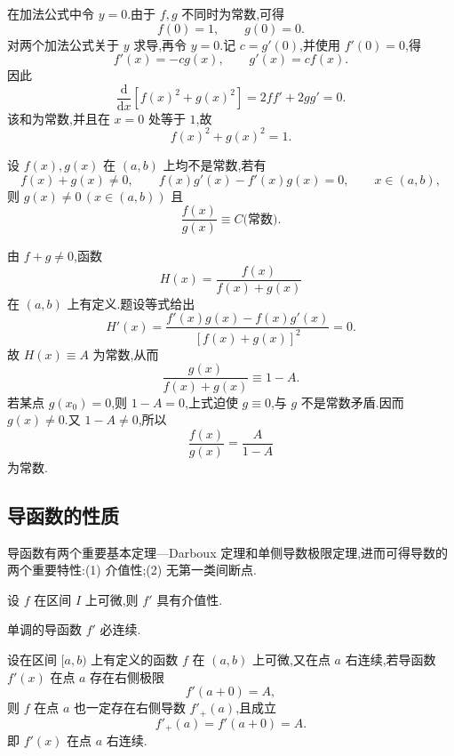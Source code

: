 \begin{solution}
    在加法公式中令 $y=0$.由于 $f,g$ 不同时为常数,可得
    \[
        f(0)=1,
        \qquad
        g(0)=0.
    \]
    对两个加法公式关于 $y$ 求导,再令 $y=0$.记 $c=g'(0)$,并使用 $f'(0)=0$,得
    \[
        f'(x)=-c g(x),
        \qquad
        g'(x)=c f(x).
    \]
    因此
    \[
        \dfrac{\mathrm{d}}{\mathrm{d}x}\left[f(x)^2+g(x)^2\right]
        =2ff'+2gg'=0.
    \]
    该和为常数,并且在 $x=0$ 处等于 $1$,故
    \[
        f(x)^2+g(x)^2=1.
    \]
\end{solution}

\begin{example}
    设 $f(x),g(x)$ 在 $(a,b)$ 上均不是常数,若有
    \[
        f(x)+g(x)\neq0,
        \qquad
        f(x)g'(x)-f'(x)g(x)=0,
        \qquad x\in(a,b),
    \]
    则 $g(x)\neq0\,(x\in(a,b))$ 且
    \[
        \dfrac{f(x)}{g(x)}\equiv C\text{(常数)}.
    \]
\end{example}
\exampleblank

\begin{solution}
    由 $f+g\neq0$,函数
    \[
        H(x)=\dfrac{f(x)}{f(x)+g(x)}
    \]
    在 $(a,b)$ 上有定义.题设等式给出
    \[
        H'(x)=\dfrac{f'(x)g(x)-f(x)g'(x)}{[f(x)+g(x)]^2}=0.
    \]
    故 $H(x)\equiv A$ 为常数,从而
    \[
        \dfrac{g(x)}{f(x)+g(x)}\equiv1-A.
    \]
    若某点 $g(x_0)=0$,则 $1-A=0$,上式迫使 $g\equiv0$,与 $g$ 不是常数矛盾.因而 $g(x)\neq0$.又 $1-A\neq0$,所以
    \[
        \dfrac{f(x)}{g(x)}
        =\dfrac{A}{1-A}
    \]
    为常数.
\end{solution}



\subsection{导函数的性质}

导函数有两个重要基本定理---Darboux 定理和单侧导数极限定理,进而可得导数的两个重要特性:(1) 介值性;(2) 无第一类间断点.

\begin{theorem}
    设 $f$ 在区间 $I$ 上可微,则 $f'$ 具有介值性.
\end{theorem}

\begin{corollary}[\markstar]
    单调的导函数 $f'$ 必连续.
\end{corollary}

\begin{theorem}
    设在区间 $\lbrack a,b)$ 上有定义的函数 $f$ 在 $(a,b)$ 上可微,又在点 $a$ 右连续,若导函数 $f'(x)$ 在点 $a$ 存在右侧极限
    \[
        f'(a+0)=A,
    \]
    则 $f$ 在点 $a$ 也一定存在右侧导数 $f'_+(a)$,且成立
    \[
        f'_+(a)=f'(a+0)=A.
    \]
    即 $f'(x)$ 在点 $a$ 右连续.
\end{theorem}

